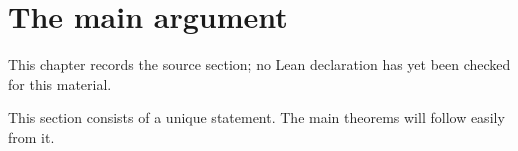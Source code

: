\chapter{The main argument}
\label{birational-section-conjecture-strong-birationality-chapter-05}

\begin{remark}
\label{birational-section-conjecture-strong-birationality-chapter-05-source}
This chapter records the source section; no Lean declaration has yet been checked for this material.
\notready
\end{remark}

This section consists of a unique statement. The main theorems will follow easily from it.

